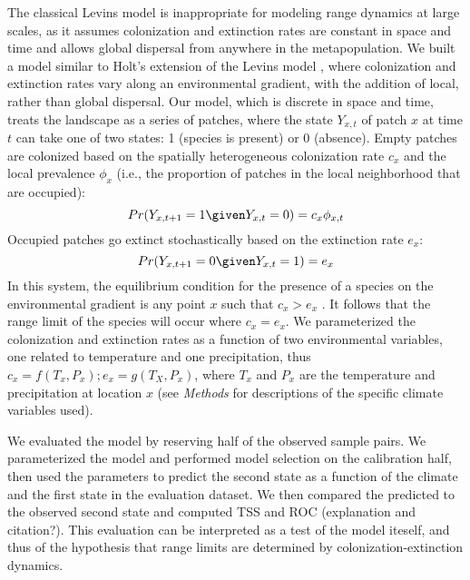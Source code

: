 \documentclass[11pt]{article}
\begin{document}
The classical Levins model is inappropriate for modeling range dynamics at large scales, as it assumes colonization and extinction rates are constant in space and time and allows global dispersal from anywhere in the metapopulation. 
We built a model similar to Holt's extension of the Levins model \cite{Holt2000}, where colonization and extinction rates vary along an environmental gradient, with the addition of local, rather than global dispersal.
Our model, which is discrete in space and time, treats the landscape as a series of patches, where the state $Y_{x,t}$ of patch $x$ at time $t$ can take one of two states: 1 (species is present) or 0 (absence).
Empty patches are colonized based on the spatially heterogeneous colonization rate $c_x$ and the local prevalence $\phi_{x}$ (i.e., the proportion of patches in the local neighborhood that are occupied):
\begin{equation}
	Pr(Y_{x,t+1} = 1 \given Y_{x,t} = 0) = c_{x}\phi_{x,t}
\end{equation}
Occupied patches go extinct stochastically based on the extinction rate $e_x$:
\begin{equation}
	Pr(Y_{x,t+1} = 0 \given Y_{x,t} = 1) = e_{x}
\end{equation}
In this system, the equilibrium condition for the presence of a species on the environmental gradient is any point $x$ such that $c_x > e_x$ \cite{Holt2000}.
It follows that the range limit of the species will occur where $c_x = e_x$.
We parameterized the colonization and extinction rates as a function of two environmental variables, one related to temperature and one precipitation, thus $c_x = f(T_x, P_x); e_x = g(T_X, P_x)$, where $T_x$ and $P_x$ are the temperature and precipitation at location $x$ (see \emph{Methods} for descriptions of the specific climate variables used).



We evaluated the model by reserving half of the observed sample pairs.
We parameterized the model and performed model selection on the calibration half, then used the parameters to predict the second state as a function of the climate and the first state in the evaluation dataset.
We then compared the predicted to the observed second state and computed TSS and ROC (explanation and citation?).
This evaluation can be interpreted as a test of the model iteself, and thus of the hypothesis that range limits are determined by colonization-extinction dynamics.
\end{document}
